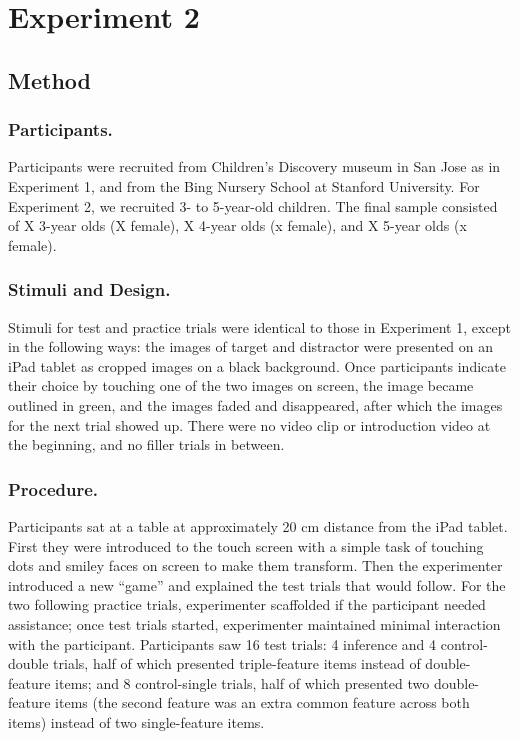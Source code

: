 \documentclass[10pt,letterpaper]{article}
\begin{document}
\section{Experiment 2}

\subsection{Method}

\subsubsection{Participants.}

Participants were recruited from Children's Discovery museum in San Jose as in Experiment 1, and from the Bing Nursery School at Stanford University. For Experiment 2, we recruited 3- to 5-year-old children. The final sample consisted of X 3-year olds (X female), X 4-year olds (x female), and X 5-year olds (x female).


\subsubsection{Stimuli and Design.}

Stimuli for test and practice trials were identical to those in Experiment 1, except in the following ways: the images of target and distractor were presented on an iPad tablet as cropped images on a black background. Once participants indicate their choice by touching one of the two images on screen, the image became outlined in green, and the images faded and disappeared, after which the images for the next trial showed up. There were no video clip or introduction video at the beginning, and no filler trials in between.

\subsubsection{Procedure.}

Participants sat at a table at approximately 20 cm distance from the iPad tablet. First they were introduced to the touch screen with a simple task of touching dots and smiley faces on screen to make them transform. Then the experimenter introduced a new ``game'' and explained the test trials that would follow. For the two following practice trials, experimenter scaffolded if the participant needed assistance; once test trials started, experimenter maintained minimal interaction with the participant. Participants saw 16 test trials: 4 inference and 4 control-double trials, half of which presented triple-feature items instead of double-feature items; and 8 control-single trials, half of which presented two double-feature items (the second feature was an extra common feature across both items) instead of two single-feature items.
\end{document}
